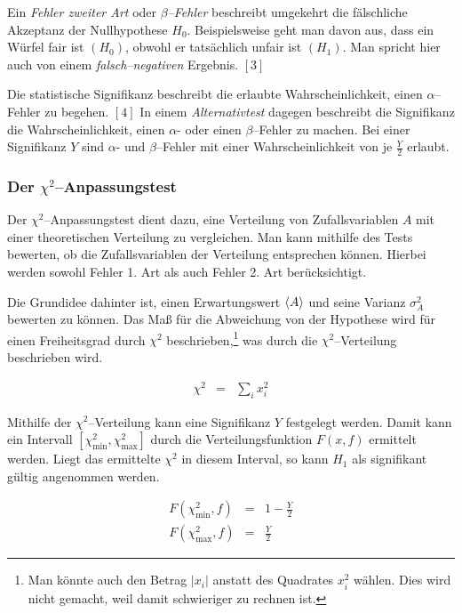 \documentclass[12pt,a4paper]{scrartcl}
\numberwithin{equation}{section} %
\renewcommand{\[}{} %
\renewcommand{\]}{\noindent} %
\begin{document}
Ein \emph{Fehler zweiter Art} oder \emph{\(\beta\)--Fehler} beschreibt
umgekehrt die fälschliche Akzeptanz der Nullhypothese \(H_0\).
Beispielsweise geht man davon aus, dass ein Würfel fair ist \((H_0)\),
obwohl er tatsächlich unfair ist \((H_1)\). Man spricht hier auch von
einem \emph{falsch--negativen} Ergebnis. \([3]\)

Die statistische Signifikanz beschreibt die erlaubte Wahrscheinlichkeit,
einen \(\alpha\)--Fehler zu begehen. \([4]\) In einem
\emph{Alternativtest} dagegen beschreibt die Signifikanz die
Wahrscheinlichkeit, einen \(\alpha\)- oder einen \(\beta\)--Fehler zu
machen. Bei einer Signifikanz \(Y\) sind \(\alpha\)- und
\(\beta\)--Fehler mit einer Wahrscheinlichkeit von je \(\frac{Y}{2}\)
erlaubt.

\hypertarget{der-chi2anpassungstest}{%
\subsubsection{\texorpdfstring{Der
\(\chi^2\)--Anpassungstest}{Der \textbackslash chi\^{}2--Anpassungstest}}\label{der-chi2anpassungstest}}

Der \(\chi^2\)--Anpassungstest dient dazu, eine Verteilung von
Zufallsvariablen \(A\) mit einer theoretischen Verteilung zu
vergleichen. Man kann mithilfe des Tests bewerten, ob die
Zufallsvariablen der Verteilung entsprechen können. Hierbei werden
sowohl Fehler 1. Art als auch Fehler 2. Art berücksichtigt.

Die Grundidee dahinter ist, einen Erwartungswert \(\expval{A}\) und
seine Varianz \(\sigma_A^2\) bewerten zu können. Das Maß für die
Abweichung von der Hypothese wird für einen Freiheitsgrad durch
\(\chi^2\) beschrieben,\footnote{Man könnte auch den Betrag \(|x_i|\)
  anstatt des Quadrates \(x_i^2\) wählen. Dies wird nicht gemacht, weil
  damit schwieriger zu rechnen ist.} was durch die
\(\chi^2\)--Verteilung beschrieben wird.

\[
\begin{eqnarray}
    \chi^2 &=& \sum_i x_i^2
\end{eqnarray}
\]

Mithilfe der \(\chi^2\)--Verteilung kann eine Signifikanz \(Y\)
festgelegt werden. Damit kann ein Intervall
\([\chi^2_\mathrm{min}, \chi^2_\mathrm{max}]\) durch die
Verteilungsfunktion \(F(x, f)\) ermittelt werden. Liegt das ermittelte
\(\chi^2\) in diesem Interval, so kann \(H_1\) als signifikant gültig
angenommen werden.

\[
\begin{eqnarray}
    F(\chi^2_\mathrm{min}, f) &=& 1 - \frac{Y}{2} \\
    F(\chi^2_\mathrm{max}, f) &=& \frac{Y}{2}
\end{eqnarray}
\]
\end{document}
